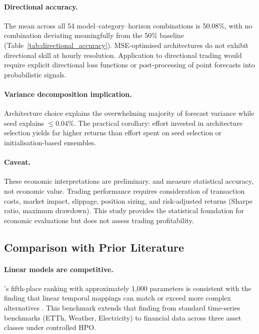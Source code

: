 \paragraph{Directional accuracy.}
The mean \da across all 54 model--category--horizon combinations is 50.08\%, with no combination deviating meaningfully from the 50\% baseline (Table~\ref{tab:directional_accuracy}).  MSE-optimised architectures do not exhibit directional skill at hourly resolution.  Application to directional trading would require explicit directional loss functions or post-processing of point forecasts into probabilistic signals.

\paragraph{Variance decomposition implication.}
Architecture choice explains the overwhelming majority of forecast variance while seed explains $\leq 0.04\%$.  The practical corollary: effort invested in architecture selection yields far higher returns than effort spent on seed selection or initialisation-based ensembles.

\paragraph{Caveat.}
These economic interpretations are preliminary.  \rmse and \mae measure statistical accuracy, not economic value.  Trading performance requires consideration of transaction costs, market impact, slippage, position sizing, and risk-adjusted returns (Sharpe ratio, maximum drawdown).  This study provides the statistical foundation for economic evaluations but does not assess trading profitability.

\subsection{Comparison with Prior Literature}
\label{sec:prior_comparison}

\paragraph{Linear models are competitive.}
\dlinear's fifth-place ranking with approximately 1{,}000 parameters is consistent with the finding that linear temporal mappings can match or exceed more complex alternatives \citep{Zeng2023}.  This benchmark extends that finding from standard time-series benchmarks (ETTh, Weather, Electricity) to financial data across three asset classes under controlled HPO.

